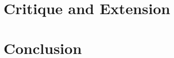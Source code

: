 \documentclass[
  11pt,
]{article}
\begin{document}
\endgroup

\hypertarget{critique-and-extension}{%
\section{Critique and Extension}\label{critique-and-extension}}

\hypertarget{conclusion}{%
\section{Conclusion}\label{conclusion}}
\end{document}
